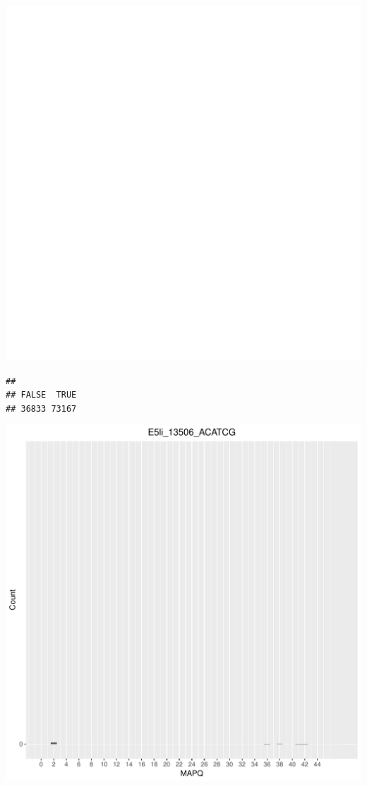 \documentclass[12pt, a4paper]{article}\usepackage[]{graphicx}\usepackage[]{color}
\makeatletter
\def\maxwidth{ %
  \ifdim\Gin@nat@width>\linewidth
    \linewidth
  \else
    \Gin@nat@width
  \fi
}
\newenvironment{kframe}{%
 \def\at@end@of@kframe{}%
 \ifinner\ifhmode%
  \def\at@end@of@kframe{\end{minipage}}%
  \begin{minipage}{\columnwidth}%
 \fi\fi%
 \def\FrameCommand##1{\hskip\@totalleftmargin \hskip-\fboxsep
 \colorbox{shadecolor}{##1}\hskip-\fboxsep
     \hskip-\linewidth \hskip-\@totalleftmargin \hskip\columnwidth}%
 \MakeFramed {\advance\hsize-\width
   \@totalleftmargin\z@ \linewidth\hsize
   \@setminipage}}%
 {\par\unskip\endMakeFramed%
 \at@end@of@kframe}
\newenvironment{knitrout}{}{} %
\makeatother
\begin{document}
\begin{knitrout}
\includegraphics[width=\maxwidth]{figure/unnamed-chunk-3-6} 
\begin{kframe}\begin{verbatim}
## 
## FALSE  TRUE 
## 36833 73167
\end{verbatim}
\end{kframe}
\includegraphics[width=\maxwidth]{figure/unnamed-chunk-3-7} 


\end{knitrout}
\end{document}
